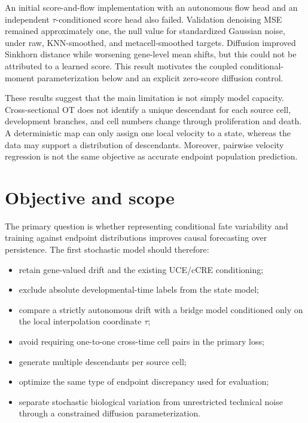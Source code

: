 \documentclass[11pt]{article}
\newcommand{\uce}{UCE}
\newcommand{\cre}{cCRE}
\begin{document}
An initial score-and-flow implementation with an autonomous flow head and an
independent $\tau$-conditioned score head also failed. Validation denoising MSE
remained approximately one, the null value for standardized Gaussian noise,
under raw, KNN-smoothed, and metacell-smoothed targets. Diffusion improved
Sinkhorn distance while worsening gene-level mean shifts, but this could not be
attributed to a learned score. This result motivates the coupled
conditional-moment parameterization below and an explicit zero-score diffusion
control.

These results suggest that the main limitation is not simply model capacity.
Cross-sectional OT does not identify a unique descendant for each source cell,
development branches, and cell numbers change through proliferation and death.
A deterministic map can only assign one local velocity to a state, whereas the
data may support a distribution of descendants. Moreover, pairwise velocity
regression is not the same objective as accurate endpoint population
prediction.

\section{Objective and scope}

The primary question is whether representing conditional fate variability and
training against endpoint distributions improves causal forecasting over
persistence. The first stochastic model should therefore:
\begin{itemize}
  \item retain gene-valued drift and the existing \uce{}/\cre{} conditioning;
  \item exclude absolute developmental-time labels from the state model;
  \item compare a strictly autonomous drift with a bridge model conditioned
        only on the local interpolation coordinate $\tau$;
  \item avoid requiring one-to-one cross-time cell pairs in the primary loss;
  \item generate multiple descendants per source cell;
  \item optimize the same type of endpoint discrepancy used for evaluation;
  \item separate stochastic biological variation from unrestricted technical
        noise through a constrained diffusion parameterization.
\end{itemize}
\end{document}
